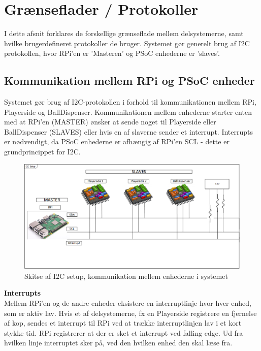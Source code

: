 \documentclass[Arkitektur/System_main.tex]{subfiles}
\begin{document}
\section{Grænseflader / Protokoller} \label{sec:protocols}
I dette afsnit forklares de forskellige grænseflade mellem delsystemerne, samt hvilke brugerdefineret protokoller de bruger. Systemet gør generelt brug af I2C protokollen, hvor RPi'en er 'Masteren' og PSoC enhederne er 'slaves'. 


\subsection{Kommunikation mellem RPi og PSoC enheder} \label{sec:RPi_PSoC_com}


Systemet gør brug af I2C-protokollen i forhold til kommunikationen mellem RPi, Playerside og BallDispenser. Kommunikationen mellem enhederne starter enten med at RPi'en (MASTER) ønsker at sende noget til Playerside eller BallDispenser (SLAVES) eller hvis en af slaverne sender et interrupt. Interrupts er nødvendigt, da PSoC enhederne er afhængig af RPi'en SCL - dette er grundprincippet for I2C. 

\begin{figure}[H]
    \centering
    \includegraphics[width=\textwidth]{Arkitektur/Grenseflader/Graphics/I2C.png}
    \caption{Skitse af I2C setup, kommunikation mellem enhederne i systemet}
    \label{fig:i2c_setup}
\end{figure}

\textbf{Interrupts}
\\Mellem RPi'en og de andre enheder eksistere en interruptlinje hvor hver enhed, som er aktiv lav. Hvis et af delsystemerne, fx en Playerside registrere en fjernelse af kop, sendes et interrupt til RPi ved at trække interruptlinjen lav i et kort stykke tid. RPi registrerer at der er sket et interrupt ved falling edge. Ud fra hvilken linje interruptet sker på, ved den hvilken enhed den skal læse fra. 
\end{document}
